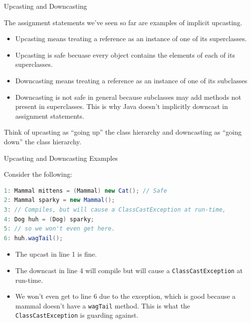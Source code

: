 \documentclass{beamer}
\begin{document}
\begin{frame}[fragile]{Upcasting and Downcasting}


The assignment statements we've seen so far are examples of implicit upcasting.
\begin{itemize}
\item Upcasting means treating a reference as an instance of one of its superclasses.
\item Upcasting is safe becuase every object contains the elements of each of its superclasses.
\item Downcasting means treating a reference as an instance of one of its subclasses
\item Downcasting is not safe in general because subclasses may add methods not present in superclasses.  This is why Java doesn't implicitly downcast in assignment statements.
\end{itemize}
Think of upcasting as ``going up'' the class hierarchy and downcasting as ``going down'' the class hierarchy.


\end{frame}

\begin{frame}[fragile]{Upcasting and Downcasting Examples}


Consider the following:
\begin{lstlisting}[language=Java]
1: Mammal mittens = (Mammal) new Cat(); // Safe
2: Mammal sparky = new Mammal();
3: // Compiles, but will cause a ClassCastException at run-time,
4: Dog huh = (Dog) sparky;
5: // so we won't even get here.
6: huh.wagTail();
\end{lstlisting}

\begin{itemize}
\item The upcast in line 1 is fine.
\item The downcast in line 4 will compile but will cause a {\tt ClassCastException} at run-time.
\item We won't even get to line 6 due to the exception, which is good because a mammal doesn't have a {\tt wagTail} method.  This is what the {\tt ClassCastException} is guarding against.
\end{itemize}


\end{frame}
\end{document}
